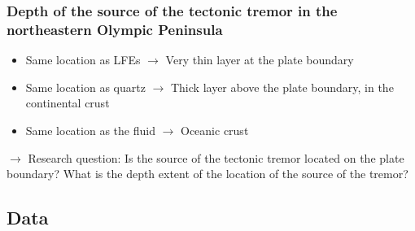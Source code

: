 \documentclass{beamer}
\begin{document}
	\begin{frame}
		\frametitle{Depth of the source of the tectonic tremor in the northeastern Olympic Peninsula}
		\begin{itemize}
			\item Same location as LFEs $\rightarrow$ Very thin layer at the plate boundary
			\item Same location as quartz $\rightarrow$ Thick layer above the plate boundary, in the continental crust
			\item Same location as the fluid $\rightarrow$ Oceanic crust
		\end{itemize}

		\begin{block}{}
			$\rightarrow$ Research question: Is the source of the tectonic tremor located on the plate boundary? What is the depth extent of the location of the source of the tremor?
		\end{block}
	\end{frame}


	\subsection{Data}
\end{document}
